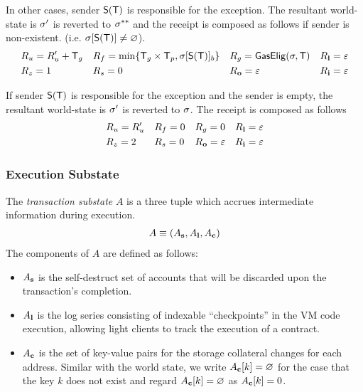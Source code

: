 In other cases, sender $\mathsf{S}{\left({\textsf{T}} \right)}$ is responsible for the exception. The resultant world-state is $\mathbf{\sigma}'$ is reverted to $\mathbf{\sigma}^{**}$ and the receipt is composed as follows if sender is non-existent. (i.e. $\mathbf{\sigma}[\mathsf{S}{\left({\textsf{T}} \right)}]\neq\varnothing$).
\begin{align}
	&R_u=R'_u+\textsf{T}_g && R_f=\min\{\textsf{T}_g\times\textsf{T}_p,\mathbf{\sigma}[\mathsf{S}{\left({\textsf{T}} \right)}]_b\} && R_g=\mathsf{GasElig}(\mathbf{\sigma},\textsf{T}) && R_{\bf l}=\mathbb{\varepsilon} \\
	&R_z=1 && R_s=0 && R_{\bf o}=\mathbb{\varepsilon} && R_{\bf i}=\mathbb{\varepsilon}
\end{align}

If sender $\mathsf{S}{\left({\textsf{T}} \right)}$ is responsible for the exception and the sender is empty, the resultant world-state is $\mathbf{\sigma}'$ is reverted to $\mathbf{\sigma}$. The receipt is composed as follows
\begin{align}
	&R_u=R'_u && R_f=0 && R_g=0 && R_{\bf l}=\mathbb{\varepsilon} \\
	&R_z=2 && R_s=0 && R_{\bf o}=\mathbb{\varepsilon} && R_{\bf i}=\mathbb{\varepsilon}
\end{align}


\subsubsection{Execution Substate}
\label{subsubsec:substate}

The \emph{transaction substate} $A$ is a three tuple which accrues intermediate information during execution. 
\begin{align}
	A\equiv \left( A_{\bf s}, A_{\bf l}, A_{\bf c}\right)
\end{align}
The components of $A$ are defined as follows: 
\begin{itemize}[nosep]
	\item $A_{\bf s}$ is the self-destruct set of accounts that will be discarded upon the transaction's completion.

	\item $A_{\bf l}$ is the log series consisting of indexable ``checkpoints'' in the VM code execution, allowing light clients to track the execution of a contract.
	
	\item $A_{\bf c}$ is the set of key-value pairs for the storage collateral changes for each address. Similar with the world state, we write $A_{\bf c}[k]=\varnothing$ for the case that the key $k$ does not exist and regard $A_{\bf c}[k]=\varnothing$ as $A_{\bf c}[k]=0$.

\end{itemize}


